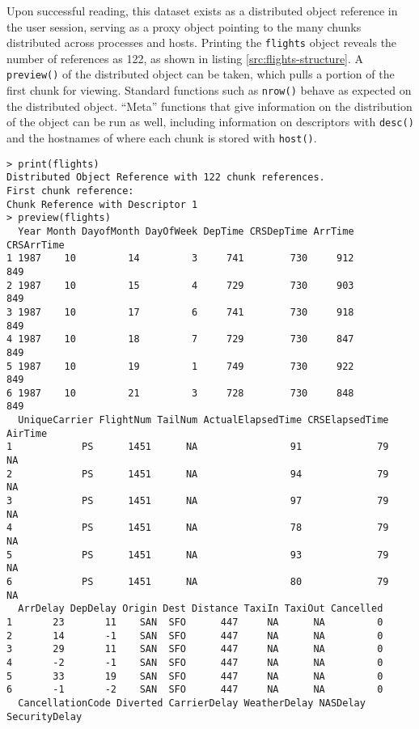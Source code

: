 Upon successful reading, this dataset exists as a distributed object reference in the user session, serving as a proxy object pointing to the many chunks distributed across processes and hosts.
Printing the \texttt{flights} object reveals the number of references as 122, as shown in listing \ref{src:flights-structure}.
A \texttt{preview()} of the distributed object can be taken, which pulls a portion of the first chunk for viewing.
Standard functions such as \texttt{nrow()} behave as expected on the distributed object.
``Meta'' functions that give information on the distribution of the object can be run as well, including information on descriptors with \texttt{desc()} and the hostnames of where each chunk is stored with \texttt{host()}.

\begin{listing}%
\begin{verbatim}
> print(flights)
Distributed Object Reference with 122 chunk references.
First chunk reference:
Chunk Reference with Descriptor 1
> preview(flights)
  Year Month DayofMonth DayOfWeek DepTime CRSDepTime ArrTime CRSArrTime
1 1987    10         14         3     741        730     912        849
2 1987    10         15         4     729        730     903        849
3 1987    10         17         6     741        730     918        849
4 1987    10         18         7     729        730     847        849
5 1987    10         19         1     749        730     922        849
6 1987    10         21         3     728        730     848        849
  UniqueCarrier FlightNum TailNum ActualElapsedTime CRSElapsedTime AirTime
1            PS      1451      NA                91             79      NA
2            PS      1451      NA                94             79      NA
3            PS      1451      NA                97             79      NA
4            PS      1451      NA                78             79      NA
5            PS      1451      NA                93             79      NA
6            PS      1451      NA                80             79      NA
  ArrDelay DepDelay Origin Dest Distance TaxiIn TaxiOut Cancelled
1       23       11    SAN  SFO      447     NA      NA         0
2       14       -1    SAN  SFO      447     NA      NA         0
3       29       11    SAN  SFO      447     NA      NA         0
4       -2       -1    SAN  SFO      447     NA      NA         0
5       33       19    SAN  SFO      447     NA      NA         0
6       -1       -2    SAN  SFO      447     NA      NA         0
  CancellationCode Diverted CarrierDelay WeatherDelay NASDelay SecurityDelay

\end{verbatim}
\end{listing}
